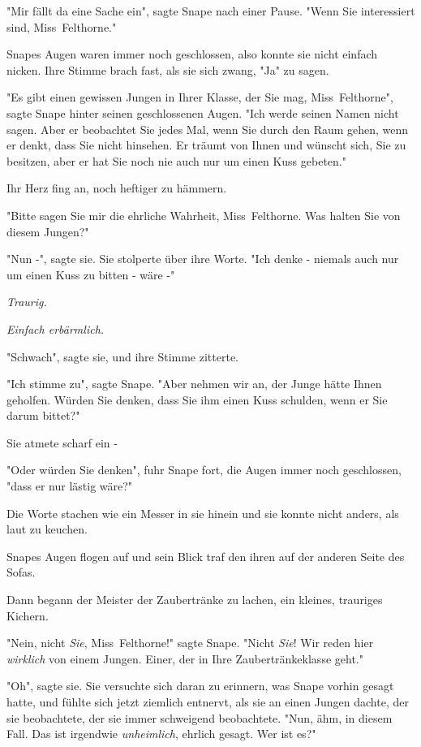 {"Mir fällt da eine Sache ein", sagte Snape nach einer Pause. "Wenn Sie interessiert sind, Miss~Felthorne."

Snapes Augen waren immer noch geschlossen, also konnte sie nicht einfach nicken. Ihre Stimme brach fast, als sie sich zwang, "Ja" zu sagen.

"Es gibt einen gewissen Jungen in Ihrer Klasse, der Sie mag, Miss~Felthorne", sagte Snape hinter seinen geschlossenen Augen. "Ich werde seinen Namen nicht sagen. Aber er beobachtet Sie jedes Mal, wenn Sie durch den Raum gehen, wenn er denkt, dass Sie nicht hinsehen. Er träumt von Ihnen und wünscht sich, Sie zu besitzen, aber er hat Sie noch nie auch nur um einen Kuss gebeten."

Ihr Herz fing an, noch heftiger zu hämmern.

"Bitte sagen Sie mir die ehrliche Wahrheit, Miss~Felthorne. Was halten Sie von diesem Jungen?"

"Nun -", sagte sie. Sie stolperte über ihre Worte. "Ich denke - niemals auch nur um einen Kuss zu bitten - wäre -"

\emph{Traurig.}

\emph{Einfach erbärmlich.}

"Schwach", sagte sie, und ihre Stimme zitterte.

"Ich stimme zu", sagte Snape. "Aber nehmen wir an, der Junge hätte Ihnen geholfen. Würden Sie denken, dass Sie ihm einen Kuss schulden, wenn er Sie darum bittet?"

Sie atmete scharf ein -

"Oder würden Sie denken", fuhr Snape fort, die Augen immer noch geschlossen, "dass er nur lästig wäre?"

Die Worte stachen wie ein Messer in sie hinein und sie konnte nicht anders, als laut zu keuchen.

Snapes Augen flogen auf und sein Blick traf den ihren auf der anderen Seite des Sofas.

Dann begann der Meister der Zaubertränke zu lachen, ein kleines, trauriges Kichern.

"Nein, nicht \emph{Sie}, Miss~Felthorne!" sagte Snape. "Nicht \emph{Sie}! Wir reden hier \emph{wirklich} von einem Jungen. Einer, der in Ihre Zaubertränkeklasse geht."

"Oh", sagte sie. Sie versuchte sich daran zu erinnern, was Snape vorhin gesagt hatte, und fühlte sich jetzt ziemlich entnervt, als sie an einen Jungen dachte, der sie beobachtete, der sie immer schweigend beobachtete. "Nun, ähm, in diesem Fall. Das ist irgendwie \emph{unheimlich}, ehrlich gesagt. Wer ist es?"

}
